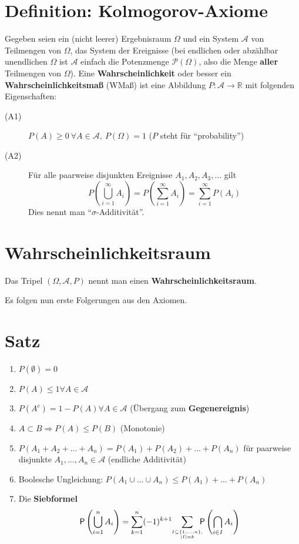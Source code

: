 \section{Definition: Kolmogorov-Axiome}

Gegeben seien ein (nicht leerer) Ergebnisraum $\Omega$ und ein System $\mathcal{A}$ von Teilmengen von $\Omega$, das System der Ereignisse (bei endlichen oder abzählbar unendlichen $\Omega$ ist $\mathcal{A}$ einfach die Potenzmenge $\mathcal{P}(\Omega)$, also die Menge \textbf{aller} Teilmengen von $\Omega$).
Eine \textbf{Wahrscheinlichkeit} oder besser ein \textbf{Wahrscheinlichkeitsmaß} (WMaß) ist eine Abbildung $P:\mathcal{A} \rightarrow \mathbb{R}$ mit folgenden Eigenschaften:
\begin{description}
 \item[(A1)] $P(A)\geq 0\ \forall A \in \mathcal{A},\ P(\Omega)=1$ ($P$ steht für ``probability'')
 \item[(A2)] Für alle paarweise disjunkten Ereignisse $A_1,A_2,A_3,\ldots$ gilt
 \begin{displaymath}
	P(\bigcup_{i=1}^\infty A_i) = P(\sum_{i=1}^\infty A_i) = \sum_{i=1}^\infty P(A_i)
 \end{displaymath}
 Dies nennt man ``$\sigma$-Additivität''.
\end{description}

\section{Wahrscheinlichkeitsraum}
Das Tripel $(\Omega,\mathcal{A},P)$ nennt man einen \textbf{Wahrscheinlichkeitsraum}.

\noindent Es folgen nun erste Folgerungen aus den Axiomen.

\section{Satz}
\renewcommand{\labelitemi}{\alph}
\begin{enumerate}
	\item $P(\emptyset) = 0$
	\item $P(A) \leq 1 \forall A \in \mathcal{A}$
	\item $P(A^c) = 1 - P(A) \forall A \in \mathcal{A}$ (Übergang zum \textbf{Gegenereignis})
	\item $A \subset B \Rightarrow P(A) \leq P(B)$ (Monotonie)
	\item $P(A_1 + A_2 + \ldots + A_n) = P(A_1) + P(A_2) + \ldots + P(A_n)$ für paarweise disjunkte $A_1,\ldots,A_n \in \mathcal{A}$ (endliche Additivität)
	\item Boolesche Ungleichung: $P(A_1 \cup \ldots \cup A_n) \leq P(A_1) + \ldots + P(A_n)$
	\item Die \textbf{Siebformel}
	\[
		\mathsf{P}\left(\bigcup_{i=1}^nA_i\right) = \sum_{k=1}^n(-1)^{k+1}\!\!\sum_{I\subseteq\{1,\dots,n\},\atop |I|=k}\!\!\!\!\mathsf{P}\left(\bigcap_{i\in I}A_i\right)
	\]
\end{enumerate}

